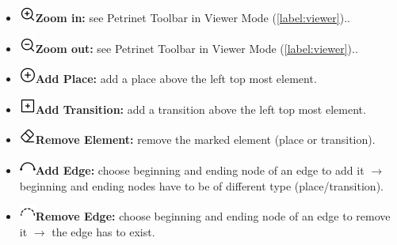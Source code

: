 \documentclass[10pt, a4paper]{article}
\begin{document}
\begin{itemize}
\item\includegraphics[scale=0.4]{../src/resources/images/Toolbar/zoom-in.png}\hspace{0.1cm}\textbf{Zoom in:} see Petrinet Toolbar in Viewer Mode (\ref{label:viewer})..
\item\includegraphics[scale=0.4]{../src/resources/images/Toolbar/zoom-out.png}\hspace{0.1cm}\textbf{Zoom out:} see Petrinet Toolbar in Viewer Mode (\ref{label:viewer})..
\item\includegraphics[scale=0.4]{../src/resources/images/Toolbar/add-circle.png}\hspace{0.1cm}\textbf{Add Place:} add a place above the left top most element.
\item\includegraphics[scale=0.4]{../src/resources/images/Toolbar/add-square.png}\hspace{0.1cm}\textbf{Add Transition:} add a transition above the left top most element.
\item\includegraphics[scale=0.4]{../src/resources/images/Toolbar/erase.png}\hspace{0.1cm}\textbf{Remove Element:} remove the marked element (place or transition).
\item\includegraphics[scale=0.4]{../src/resources/images/Toolbar/arc.png}\hspace{0.1cm}\textbf{Add Edge:} choose beginning and ending node of an edge to add it $\rightarrow$ beginning and ending nodes have to be of different type (place/transition).
\item\includegraphics[scale=0.4]{../src/resources/images/Toolbar/remove-edge.png}\hspace{0.1cm}\textbf{Remove Edge:} choose beginning and ending node of an edge to remove it $\rightarrow$ the edge has to exist.

\end{itemize}
\end{document}
